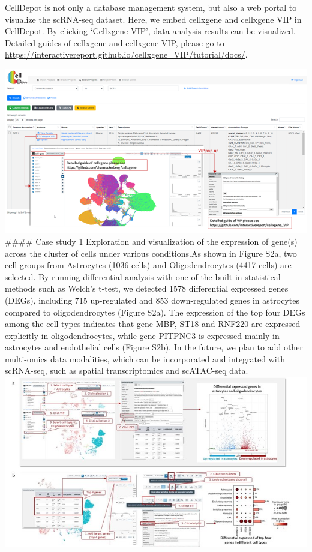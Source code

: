 \documentclass[
]{book}
\begin{document}
CellDepot is not only a database management system, but also a web portal to visualize the scRNA-seq dataset. Here, we embed cellxgene and cellxgene VIP in CellDepot. By clicking `Cellxgene VIP', data analysis results can be visualized. Detailed guides of cellxgene and cellxgene VIP, please go to \url{https://interactivereport.github.io/cellxgene_VIP/tutorial/docs/}.

\includegraphics{figures/S11.png}
\#\#\#\# Case study 1
Exploration and visualization of the expression of gene(s) across the cluster of cells under various conditions.As shown in Figure S2a, two cell groups from Astrocytes (1036 cells) and Oligodendrocytes (4417 cells) are selected. By running differential analysis with one of the built-in statistical methods such as Welch's t-test, we detected 1578 differential expressed genes (DEGs), including 715 up-regulated and 853 down-regulated genes in astrocytes compared to oligodendrocytes (Figure S2a). The expression of the top four DEGs among the cell types indicates that gene MBP, ST18 and RNF220 are expressed explicitly in oligodendrocytes, while gene PITPNC3 is expressed mainly in astrocytes and endothelial cells (Figure S2b). In the future, we plan to add other multi-omics data modalities, which can be incorporated and integrated with scRNA-seq, such as spatial transcriptomics and scATAC-seq data.
\includegraphics{figures/S2.jpg}
\end{document}
